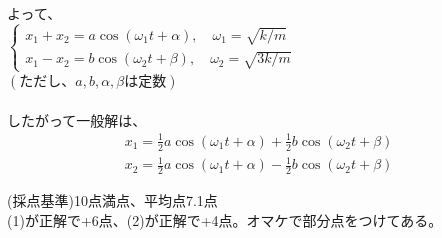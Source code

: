 \documentclass[11pt]{jarticle}
\begin{document}
\begin{enumerate}
よって、\\
$\left\{ \begin{array}{l}
x_1+x_2=a\cos({\omega}_1t+\alpha),\quad {\omega}_1=\sqrt{k/m} \\
x_1-x_2=b\cos({\omega}_2t+\beta),\quad {\omega}_2=\sqrt{3k/m}
\end{array} \right.$\\
$(ただし、a,b,\alpha ,\beta は定数)$\\
\\
したがって一般解は、
\begin{eqnarray*}
x_1=\frac{1}{2}a\cos({\omega}_1t+\alpha)+\frac{1}{2}b\cos({\omega}_2t+\beta)
\end{eqnarray*}
\begin{eqnarray*}
x_2=\frac{1}{2}a\cos({\omega}_1t+\alpha)-\frac{1}{2}b\cos({\omega}_2t+\beta)
\end{eqnarray*}

\end{enumerate}

\newpage
(採点基準)10点満点、平均点7.1点\\
(1)が正解で+6点、(2)が正解で+4点。オマケで部分点をつけてある。
\end{document}
